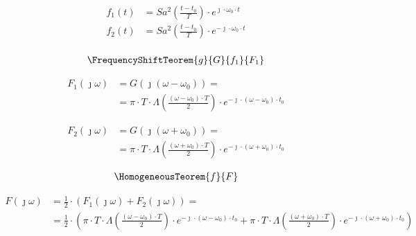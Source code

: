 \begin{task}

\begin{align*}
f_1(t)&=Sa^2\left(\frac{t-t_0}{T}\right) \cdot e^{\jmath \cdot \omega_0 \cdot t}\\
f_2(t)&=Sa^2\left(\frac{t-t_0}{T}\right) \cdot e^{-\jmath \cdot \omega_0 \cdot t}\\
\end{align*}


\begin{align*}
\FrequencyShiftTeorem{g}{G}{f_1}{F_1}
\end{align*}


\begin{align*}
F_1(\jmath \omega)&=G\left(\jmath \left(\omega -\omega_0\right)\right)=\\
&=\pi \cdot T \cdot \Lambda\left( \frac{\left(\omega-\omega_0\right) \cdot T}{2}\right) \cdot e^{-\jmath \cdot \left(\omega-\omega_0\right) \cdot t_0}
\end{align*}

\begin{align*}
F_2(\jmath \omega)&=G\left(\jmath \left(\omega +\omega_0\right)\right)=\\
&=\pi \cdot T \cdot \Lambda\left( \frac{\left(\omega+\omega_0\right) \cdot T}{2}\right) \cdot e^{-\jmath \cdot \left(\omega+\omega_0\right) \cdot t_0}
\end{align*}


\begin{align*}
\HomogeneousTeorem{f}{F}
\end{align*}


\begin{align*}
F(\jmath \omega)&=\frac{1}{2} \cdot \left(F_1(\jmath \omega)+F_2(\jmath \omega)\right)=\\
&=\frac{1}{2} \cdot \left( \pi \cdot T \cdot \Lambda\left( \frac{\left(\omega-\omega_0\right) \cdot T}{2}\right) \cdot e^{-\jmath \cdot \left(\omega-\omega_0\right) \cdot t_0} + \pi \cdot T \cdot \Lambda\left( \frac{\left(\omega+\omega_0\right) \cdot T}{2}\right) \cdot e^{-\jmath \cdot \left(\omega+\omega_0\right) \cdot t_0} \right)
\end{align*}


\end{task}
